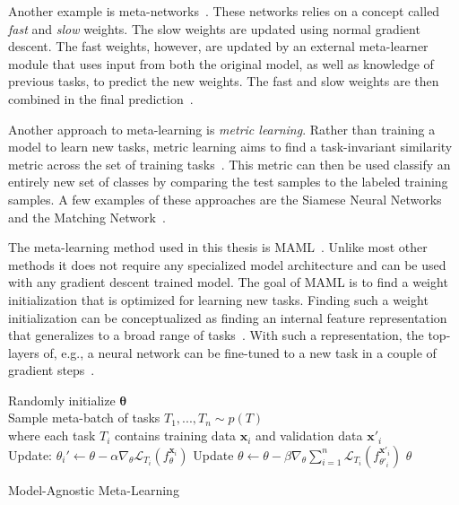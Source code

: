 Another example is meta-networks~\cite{meta-networks}. These networks relies on a concept called \textit{fast} and \textit{slow} weights. The slow weights are updated using normal gradient descent. The fast weights, however, are updated by an external meta-learner module that uses input from both the original model, as well as knowledge of previous tasks, to predict the new weights. The fast and slow weights are then combined in the final prediction~\cite{meta-networks}.

Another approach to meta-learning is \textit{metric learning}. Rather than training a model to learn new tasks, metric learning aims to find a task-invariant similarity metric across the set of training tasks~\cite{siamese}. This metric can then be used classify an entirely new set of classes by comparing the test samples to the labeled training samples. A few examples of these approaches are the Siamese Neural Networks~\cite{siamese} and the Matching Network~\cite{matching}.

 
The meta-learning method used in this thesis is \gls{MAML}~\cite{maml}. Unlike most other methods it does not require any specialized model architecture and can be used with any gradient descent trained model. The goal of \gls{MAML} is to find a weight initialization that is optimized for learning new tasks. Finding such a weight initialization can be conceptualized as finding an internal feature representation that generalizes to a broad range of tasks~\cite{maml}. With such a representation, the top-layers of, e.g., a neural network can be fine-tuned to a new task in a couple of gradient steps~\cite{maml}.

\begin{algorithm}[H]
\SetAlgoLined
{}
Randomly initialize $\bm{\theta}$ \\
 {
    Sample meta-batch of tasks $T_1,...,T_n \sim p(T)$ \\
    where each task $T_i$ contains training data $\mathbf{x}_i$ and validation data $\mathbf{x}'_i$\\
     {
        Update: $\theta_i'  \leftarrow \theta - \alpha \nabla_{\theta} \mathcal{L}_{T_i}(f_{\theta}^{\mathbf{x}_i})$
    }
    Update $\theta \leftarrow \theta - \beta \nabla_{\theta}\sum^{n}_{i=1} \mathcal{L}_{T_i}(f_{\theta'_i}^{\mathbf{x}'_i})$
}
 $\theta$ 
\caption{Model-Agnostic Meta-Learning}
\label{alg:maml}
\end{algorithm}

